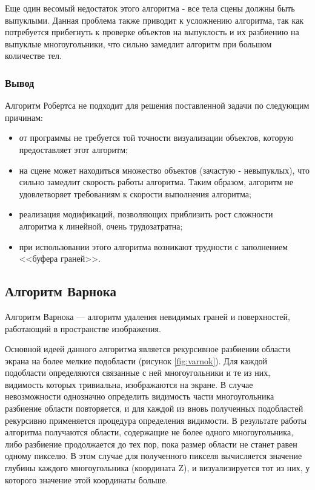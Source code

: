 Еще один весомый недостаток этого алгоритма - все тела сцены должны быть выпуклыми. Данная проблема также приводит к усложнению алгоритма, так как потребуется прибегнуть к проверке объектов на выпуклость и их разбиению на выпуклые многоугольники, что сильно замедлит алгоритм при большом количестве тел.

\clearpage

\subsubsection*{Вывод}

Алгоритм Робертса не подходит для решения поставленной задачи по следующим причинам:

\begin{itemize}[label=---]
	\item от программы не требуется той точности визуализации объектов, которую предоставляет этот алгоритм;
	\item на сцене может находиться множество объектов (зачастую - невыпуклых), что сильно замедлит скорость работы алгоритма. Таким образом, алгоритм не удовлетворяет требованиям к скорости выполнения алгоритма;
	\item реализация модификаций, позволяющих приблизить рост сложности алгоритма к линейной, очень трудозатратна;
	\item при использовании этого алгоритма возникают трудности с заполнением <<буфера граней>>.
\end{itemize}

\subsection{Алгоритм Варнока}

Алгоритм Варнока \cite{rogers_alg} --- алгоритм удаления невидимых граней и поверхностей, работающий в пространстве изображения.

Основной идеей данного алгоритма является рекурсивное разбиении области экрана на более мелкие подобласти (рисунок \ref{fig:varnok}). Для каждой подобласти определяются связанные с ней многоугольники и те из них, видимость которых тривиальна, изображаются на экране. В случае невозможности однозначно определить видимость части многоугольника разбиение области повторяется, и для каждой из вновь полученных подобластей рекурсивно применяется процедура определения видимости. В результате работы алгоритма получаются области, содержащие не более одного многоугольника, либо разбиение продолжается до тех пор, пока размер области не станет равен одному пикселю. В этом случае для полученного пикселя вычисляется значение глубины каждого многоугольника (координата Z), и визуализируется тот из них, у которого значение этой координаты больше.

